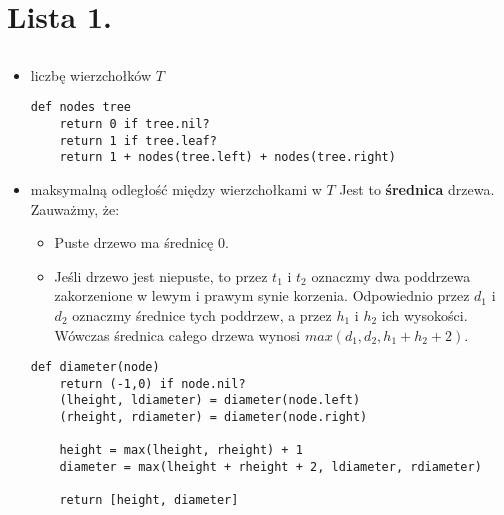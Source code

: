 \documentclass[svgnames]{report}
\begin{document}
%

\chapter{Lista 1.}

\section{}%
\begin{itemize}
\item{liczbę wierzchołków $T$}
\begin{lstlisting}
def nodes tree
	return 0 if tree.nil?
	return 1 if tree.leaf?
	return 1 + nodes(tree.left) + nodes(tree.right)
\end{lstlisting}

\item{maksymalną odległość między wierzchołkami w $T$}
Jest to \textbf{średnica} drzewa.
Zauważmy, że:
\begin{itemize}
\item Puste drzewo ma średnicę $0$.
\item Jeśli drzewo jest niepuste, to przez $t_1$ i $t_2$ oznaczmy dwa poddrzewa zakorzenione w lewym i prawym synie korzenia. Odpowiednio przez $d_1$ i $d_2$ oznaczmy średnice tych poddrzew, a przez $h_1$ i $h_2$ ich wysokości. Wówczas średnica całego drzewa wynosi $max(d_1, d_2, h_1+h_2+2)$.
\end{itemize}
\begin{lstlisting}
def diameter(node) 
	return (-1,0) if node.nil? 
	(lheight, ldiameter) = diameter(node.left)
	(rheight, rdiameter) = diameter(node.right)
	
	height = max(lheight, rheight) + 1
	diameter = max(lheight + rheight + 2, ldiameter, rdiameter)

	return [height, diameter]
\end{lstlisting}
\end{itemize}
\end{document}
